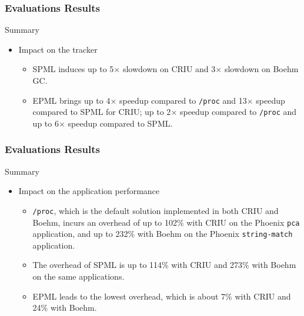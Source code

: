 \documentclass[xcolor=table,bigger,unknownkeysallowed]{beamer}
\begin{document}
        \begin{frame}
                \frametitle{Evaluations Results}
				\begin{block}{Summary}
					\begin{itemize}
						\item Impact on the tracker
						\begin{itemize}
							\item SPML induces up to 5$\times$ slowdown on CRIU and 3$\times$ slowdown on Boehm GC.
							\item EPML brings up to 4$\times$ speedup compared to \texttt{/proc} and 13$\times$ speedup compared to SPML for CRIU; up to 2$\times$ speedup compared to \texttt{/proc} and up to 6$\times$ speedup compared to SPML.
						\end{itemize}																							
					\end{itemize}
			\end{block}
        \end{frame}  
        \begin{frame}
                \frametitle{Evaluations Results}
				\begin{block}{Summary}
					\begin{itemize}		
						\item Impact on the application performance
						\begin{itemize}
							\item \texttt{/proc}, which is the default solution implemented in both CRIU and Boehm, incurs an overhead of up to 102\% with CRIU on the Phoenix \texttt{pca} application, and up to 232\% with Boehm on the Phoenix \texttt{string-match} application.
							\item The overhead of SPML is up to 114\% with CRIU and 273\% with Boehm on the same applications.
							\item EPML leads to the lowest overhead, which is about 7\% with CRIU and 24\% with Boehm.
						\end{itemize}																							
					\end{itemize}
			\end{block}
        \end{frame}           
\end{document}
